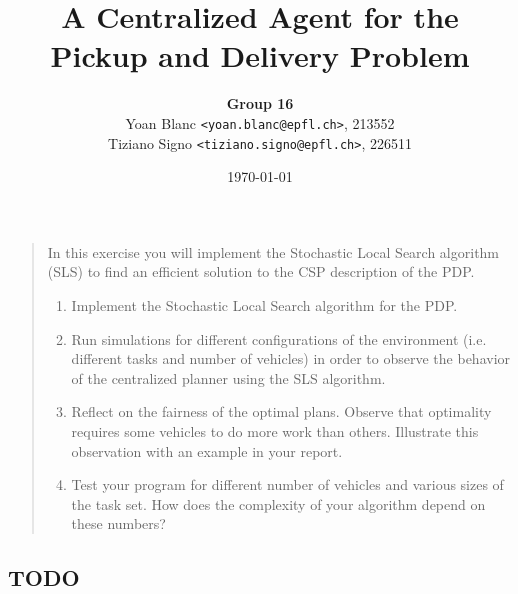 \documentclass[11pt,a4paper]{article}
\title{\phantomsection%
    A Centralized Agent for the Pickup and Delivery Problem
}
\author{
    \textbf{Group 16}\\
    Yoan Blanc \texttt{<yoan.blanc@epfl.ch>}, 213552\\
    Tiziano Signo \texttt{<tiziano.signo@epfl.ch>}, 226511
}
\date{\today}
\begin{document}
\maketitle

\noindent
\begin{quote}{\it

    In this exercise you will implement the Stochastic Local Search algorithm
    (SLS) to find an efficient solution to the CSP description of the PDP. 

    \begin{enumerate}
        \item Implement the Stochastic Local Search algorithm for the PDP.

        \item Run simulations for different configurations of the environment
        (i.e. different tasks and number of vehicles) in order to observe the
        behavior of the centralized planner using the SLS algorithm.

        \item Reflect on the fairness of the optimal plans. Observe that
        optimality requires some vehicles to do more work than others.
        Illustrate this observation with an example in your report.

        \item Test your program for different number of vehicles and various
        sizes of the task set. How does the complexity of your algorithm depend
        on these numbers?

    \end{enumerate}

}\end{quote}

\newpage
\subsection*{TODO}
\end{document}
